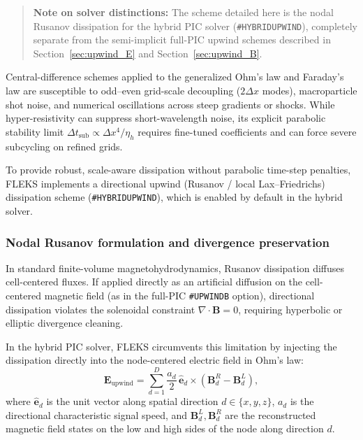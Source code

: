 \documentclass[a4paper, 11pt]{article}
\begin{document}
\begin{quote}
\small
\textbf{Note on solver distinctions:} The scheme detailed here is the nodal Rusanov dissipation for the hybrid PIC solver (\texttt{\#HYBRIDUPWIND}), completely separate from the semi-implicit full-PIC upwind schemes described in Section~\ref{sec:upwind_E} and Section~\ref{sec:upwind_B}.
\end{quote}

Central-difference schemes applied to the generalized Ohm's law and Faraday's law are susceptible to odd--even grid-scale decoupling ($2\Delta x$ modes), macroparticle shot noise, and numerical oscillations across steep gradients or shocks. While hyper-resistivity can suppress short-wavelength noise, its explicit parabolic stability limit $\Delta t_{\text{sub}} \propto \Delta x^4 / \eta_h$ requires fine-tuned coefficients and can force severe subcycling on refined grids.

To provide robust, scale-aware dissipation without parabolic time-step penalties, FLEKS implements a directional upwind (Rusanov / local Lax--Friedrichs) dissipation scheme (\texttt{\#HYBRIDUPWIND}), which is enabled by default in the hybrid solver.

\subsubsection{Nodal Rusanov formulation and divergence preservation}

In standard finite-volume magnetohydrodynamics, Rusanov dissipation diffuses cell-centered fluxes. If applied directly as an artificial diffusion on the cell-centered magnetic field (as in the full-PIC \texttt{\#UPWINDB} option), directional dissipation violates the solenoidal constraint $\nabla \cdot \mathbf{B} = 0$, requiring hyperbolic or elliptic divergence cleaning.

In the hybrid PIC solver, FLEKS circumvents this limitation by injecting the dissipation directly into the node-centered electric field in Ohm's law:
\begin{equation}
\mathbf{E}_{\text{upwind}} = \sum_{d=1}^D \frac{a_d}{2}\, \hat{\mathbf{e}}_d \times \left(\mathbf{B}^R_d - \mathbf{B}^L_d\right),
\label{eq:hybrid_upwind}
\end{equation}
where $\hat{\mathbf{e}}_d$ is the unit vector along spatial direction $d \in \{x, y, z\}$, $a_d$ is the directional characteristic signal speed, and $\mathbf{B}^L_d, \mathbf{B}^R_d$ are the reconstructed magnetic field states on the low and high sides of the node along direction $d$.
\end{document}
